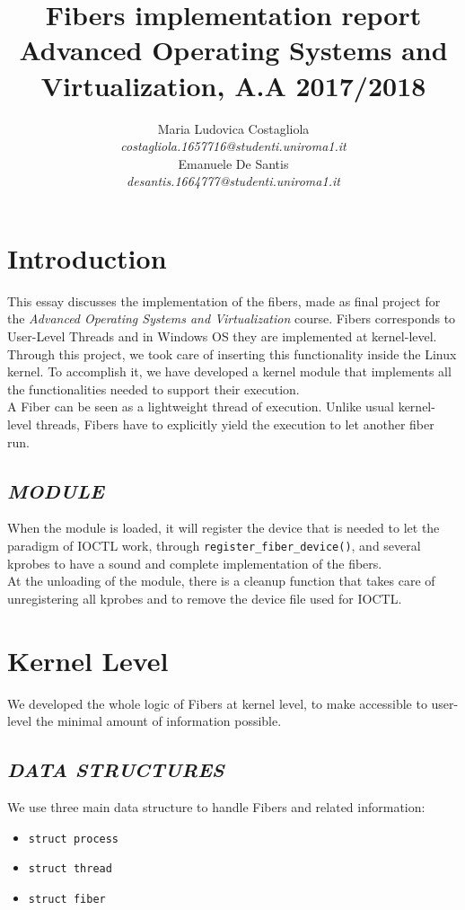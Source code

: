 \documentclass[a4paper]{article}
\author{\large Maria Ludovica Costagliola \\
        \small \textit{costagliola.1657716@studenti.uniroma1.it} \medskip\\
        \large Emanuele De Santis \\
        \small \textit{desantis.1664777@studenti.uniroma1.it}}
\title{Fibers implementation report\\
        \smallskip
        \small Advanced Operating Systems and Virtualization, A.A 2017/2018}
\date{}
\begin{document}
\maketitle
\section{Introduction}
This essay discusses the implementation of the fibers, made as final project for the \textit{Advanced Operating Systems and Virtualization} course. Fibers corresponds to User-Level Threads and in Windows OS they are implemented at kernel-level. Through this project, we took care of inserting this functionality inside the Linux kernel. To accomplish it, we have developed a kernel module that implements all the functionalities needed to support their execution.\bigskip\\
A Fiber can be seen as a lightweight thread of execution. Unlike usual kernel-level threads, Fibers have to explicitly yield the execution to let another fiber run.

\subsection*{\textit{MODULE}}
When the module is loaded, it will register the device that is needed to let the paradigm of IOCTL work, through \texttt{register\_fiber\_device()}, and several kprobes to have a sound and complete implementation of the fibers.\bigskip\\
At the unloading of the module, there is a cleanup function that takes care of unregistering all kprobes and to remove the device file used for IOCTL.

\section{Kernel Level}
We developed the whole logic of Fibers at kernel level, to make accessible to user-level the minimal amount of information possible.

\subsection*{\textit{DATA STRUCTURES}}
We use three main data structure to handle Fibers and related information:
\begin{itemize}
  \item \texttt{struct process}
  \item \texttt{struct thread}
  \item \texttt{struct fiber}
\end{itemize}
\end{document}

